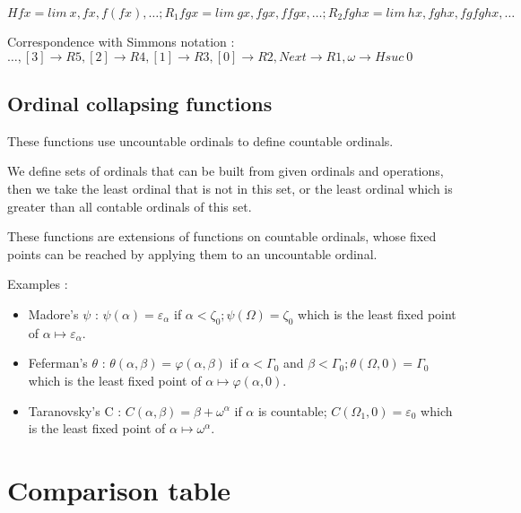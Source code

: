 \documentclass[10pt]{article}
\begin{document}
\( H f x = lim\ x, f x, f (f x), \ldots ; R_1 f g x = lim\ g x, f g x, f f g x, \ldots ; R_2 f g h x = lim\ h x, f g h x, f g f g h x, \ldots \)

Correspondence with Simmons notation : 
\( \ldots, [3] \rightarrow R5, [2] \rightarrow R4, [1] \rightarrow R3, [0] \rightarrow R2, Next \rightarrow R1, \omega \rightarrow H suc\ 0 \)



\subsection{Ordinal collapsing functions}

These functions use uncountable ordinals to define countable ordinals.

We define sets of ordinals that can be built from given ordinals and operations, then we take the least ordinal that is not in this set, or the least ordinal which is greater than all contable ordinals of this set.

These functions are extensions of functions on countable ordinals, whose fixed points can be reached by applying them to an uncountable ordinal.

Examples :

\smallskip
\begin{itemize}
     \setlength{\itemsep}{1pt}
     \setlength{\parskip}{0pt}
     \setlength{\parsep}{0pt}
\item Madore's \(\psi\) : \(\psi(\alpha) = \varepsilon_\alpha \) if \(\alpha < \zeta_0 ; \psi(\Omega) = \zeta_0 \) which is the least fixed point of \( \alpha \mapsto \varepsilon_\alpha \).

\item Feferman's \(\theta\) : \(\theta(\alpha,\beta) = \varphi(\alpha,\beta) \) if \( \alpha < \Gamma_0 \) and \( \beta < \Gamma_0 ; \theta(\Omega,0) = \Gamma_0 \) which is the least fixed point of \( \alpha \mapsto \varphi(\alpha,0) \).

\item Taranovsky's C : \( C(\alpha,\beta) = \beta+\omega^\alpha \) if \( \alpha \) is countable; \( C(\Omega_1,0) = \varepsilon_0 \) which is the least fixed point of \( \alpha \mapsto \omega^\alpha \).
\end{itemize}

\section{Comparison table}
\end{document}
